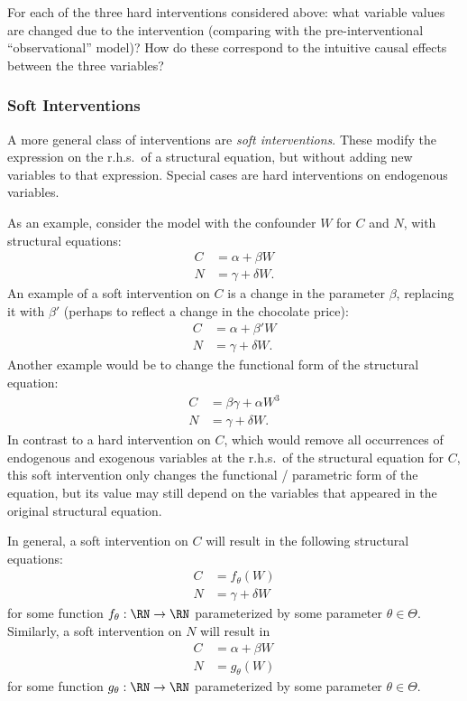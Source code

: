 \begin{Exc}
  For each of the three hard interventions considered above: what variable values are changed due to the intervention (comparing with the pre-interventional ``observational'' model)? 
  How do these correspond to the intuitive causal effects between the three variables?
\end{Exc}

\subsubsection{Soft Interventions}

A more general class of interventions are \emph{soft interventions}. These modify 
the expression on the r.h.s.\ of a structural equation, but without adding new variables
to that expression. Special cases are hard interventions on endogenous variables.

As an example, consider the model with the confounder $W$ for $C$ and $N$, with 
structural equations:
    \begin{align*}
      C &= \alpha + \beta W \\
      N &= \gamma + \delta W.
    \end{align*}
An example of a soft intervention on $C$ is a change in the parameter $\beta$, replacing it
with $\beta'$ (perhaps to reflect a change in the chocolate price):
    \begin{align*}
      C &= \alpha + \beta' W \\
      N &= \gamma + \delta W.
    \end{align*}
Another example would be to change the functional form of the structural equation:
    \begin{align*}
      C &= \beta\gamma + \alpha W^3 \\
      N &= \gamma + \delta W.
    \end{align*}
In contrast to a hard intervention on $C$, which would remove all occurrences of 
endogenous and exogenous variables at the r.h.s.\ of the structural equation for $C$,
this soft intervention only changes the functional / parametric form of the equation,
but its value may still depend on the variables that appeared in the original 
structural equation.

In general, a soft intervention on $C$ will result in the following structural equations:
    \begin{align*}
      C &= f_{\theta}(W) \\
      N &= \gamma + \delta W
    \end{align*}
for some function $f_{\theta} : \RN \to \RN$ parameterized by some parameter $\theta \in \Theta$.
Similarly, a soft intervention on $N$ will result in
    \begin{align*}
      C &= \alpha + \beta W \\
      N &= g_{\theta}(W)
    \end{align*}
for some function $g_{\theta} : \RN \to \RN$ parameterized by some parameter $\theta \in \Theta$.

